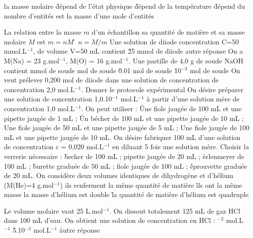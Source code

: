 \q la masse molaire 
\r dépend de l'état physique 
\r dépend de la température 
\r dépend du nombre d'entités 
\rv est la masse d'une mole d'entités 

\q La relation entre la masse $m$ d'un échantillon sa quantité de matière et sa masse molaire $M$ est
\rv
$m=nM$
\r
$n=M/m$
\q Une solution de diiode concentration C=50 mmol.L$^{-1}$, de volume V=50 mL contient
\r
25 mmol de diiode
\rv
autre réponse
\q On a M(Na) = 23 g.mol$^{-1}$, M(O) = 16 g.mol$^{-1}$. Une pastille de 4,0 g de soude NaOH contient 
 mmol de soude
 mol de soude
\r
0.01 mol de soude
\r 
10$^{-3}$ mol de soude
\q On veut prélever 0,200 mol de diiode dans une solution de concentration de concentration 2,0 mol.L$^{-1}$. Donner le protocole expérimental
\q	
On désire préparer une solution de concentration 1,0.10$^{-1}$ mol.L$^{-1}$ à partir  d'une solution mère de concentration 1,0 mol.L$^{-1}$.  On peut utiliser :
\r
Une fiole jaugée de 100 mL et une pipette jaugée de 1 mL ;
\r
Un bécher de 100 mL et une pipette jaugée de 10 mL ;
\rv
Une fiole jaugée de 50 mL et une pipette jaugée de 5 mL ;
\rv
Une fiole jaugée de 100 mL et une pipette jaugée de 10 mL.
\q	
On désire fabriquer 100 mL d'une solution de concentration   c = 0,020 mol.L$^{-1}$ en diluant 5 fois une solution mère. Choisir la verrerie nécessaire :
\r
becher de 100 mL ;		
\rv
pipette jaugée de 20 mL ;
\r
erlenmeyer de 100 mL ;	
\r
burette graduée de 50 mL ;
\rv
fiole jaugée de 100 mL ; 
\r
éprouvette graduée de 20 mL.
\q  On considère deux volumes identiques de dihydrogène et d'hélium (M(He)=4 g.mol$^{-1}$)
\rv ils renferment la même quantité de matière
\r ils ont la même masse
\rv la masse d'hélium est double
\r la quantité de matière d'hélium est quadruple 

\q Le volume molaire vaut 25 L.mol$^{-1}$. On dissout totalement 125 mL de gaz HCl dans 100 mL d'eau. On obtient une solution de concentration en HCl :
$^{-2}$ mol.L$^{-1}$
\r 5.10$^{-3}$ mol.L$^{-1}$
\r autre réponse
 
